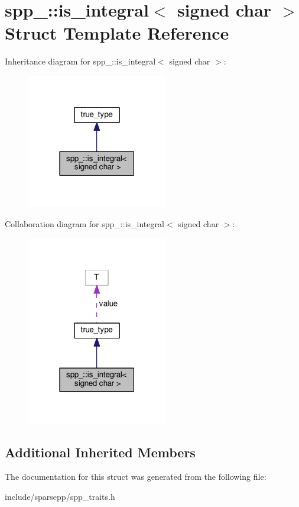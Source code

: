 \hypertarget{structspp___1_1is__integral_3_01signed_01char_01_4}{}\section{spp\+\_\+\+:\+:is\+\_\+integral$<$ signed char $>$ Struct Template Reference}
\label{structspp___1_1is__integral_3_01signed_01char_01_4}


Inheritance diagram for spp\+\_\+\+:\+:is\+\_\+integral$<$ signed char $>$\+:\nopagebreak
\begin{figure}[H]
\begin{center}
\leavevmode
\includegraphics[width=174pt]{structspp___1_1is__integral_3_01signed_01char_01_4__inherit__graph}
\end{center}
\end{figure}


Collaboration diagram for spp\+\_\+\+:\+:is\+\_\+integral$<$ signed char $>$\+:\nopagebreak
\begin{figure}[H]
\begin{center}
\leavevmode
\includegraphics[width=174pt]{structspp___1_1is__integral_3_01signed_01char_01_4__coll__graph}
\end{center}
\end{figure}
\subsection*{Additional Inherited Members}


The documentation for this struct was generated from the following file\+:\begin{DoxyCompactItemize}
\item 
include/sparsepp/spp\+\_\+traits.\+h\end{DoxyCompactItemize}

